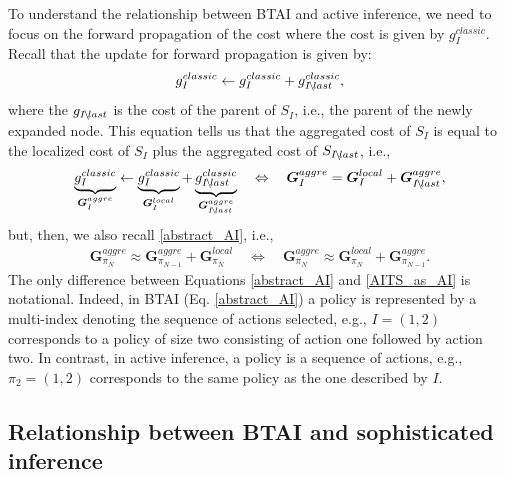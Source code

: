 \documentclass[twoside,11pt]{article}
\newcommand*\IdMLast[1]{{\normalfont #1\hspace{-0.04cm}\setminus\hspace{-0.04cm} last}}
\begin{document}
To understand the relationship between BTAI and active inference, we need to focus on the forward propagation of the cost where the cost is given by $g^{classic}_I$. Recall that the update for forward propagation is given by:
\begin{align}
g^{classic}_I \leftarrow g^{classic}_I + g^{classic}_\IdMLast{I},
\end{align}
where the $g_\IdMLast{I}$ is the cost of the parent of $S_I$, i.e., the parent of the newly expanded node. This equation tells us that the aggregated cost of $S_I$ is equal to the localized cost of $S_I$ plus the aggregated cost of $S_\IdMLast{I}$, i.e.,
\begin{align} \label{AITS_as_AI}
\underbrace{g^{classic}_I}_{\bm{G}^{aggre}_I} \leftarrow \underbrace{g^{classic}_I}_{\bm{G}^{local}_I} + \underbrace{g^{classic}_\IdMLast{I}}_{\bm{G}^{aggre}_\IdMLast{I}} \quad \Leftrightarrow \quad \bm{G}^{aggre}_I = \bm{G}^{local}_I + \bm{G}^{aggre}_\IdMLast{I},
\end{align}
but, then, we also recall \eqref{abstract_AI}, i.e.,
\begin{align}
\bm{G}_{\pi_{N}}^{aggre} \approx \bm{G}_{\pi_{N-1}}^{aggre} + \bm{G}_{\pi_{N}}^{local} \quad \Leftrightarrow \quad \bm{G}_{\pi_{N}}^{aggre} \approx \bm{G}_{\pi_{N}}^{local} + \bm{G}_{\pi_{N-1}}^{aggre}.
\end{align}
The only difference between Equations \ref{abstract_AI} and \ref{AITS_as_AI} is notational. Indeed, in BTAI (Eq. \ref{abstract_AI}) a policy is represented by a multi-index denoting the sequence of actions selected, e.g., $I = (1, 2)$ corresponds to a policy of size two consisting of action one followed by action two. In contrast, in active inference, a policy is a sequence of actions, e.g., $\pi_{2} = (1, 2)$ corresponds to the same policy as the one described by $I$.

\subsection{Relationship between BTAI and sophisticated inference} \label{ssec:BTAI_relate_to_SI}
\end{document}
